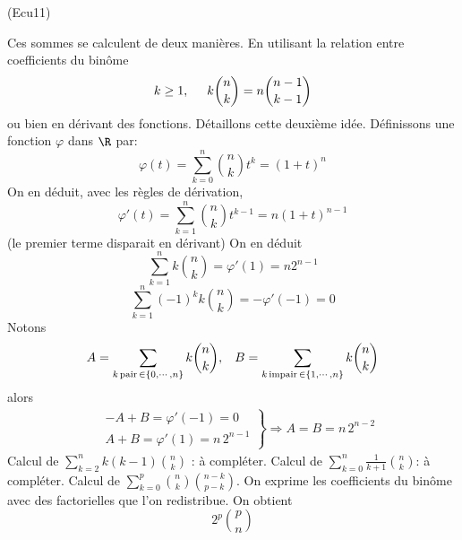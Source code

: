 \begin{tiny}(Ecu11)\end{tiny} Ces sommes se calculent de deux manières. En utilisant la relation entre coefficients du binôme
\begin{displaymath}
  k\geq1,\hspace{0.5cm} k\binom{n}{k} = n\binom{n-1}{k-1} 
\end{displaymath}
ou bien en dérivant des fonctions. Détaillons cette deuxième idée.\newline
Définissons une fonction $\varphi$ dans $\R$ par:
\begin{displaymath}
  \varphi(t) = \sum_{k=0}^n\binom{n}{k}t^k = (1+t)^n
\end{displaymath}
On en déduit, avec les règles de dérivation,
\begin{displaymath}
  \varphi'(t)= \sum_{k=1}^n\binom{n}{k}t^{k-1} = n(1+t)^{n-1}
\end{displaymath}
(le premier terme disparait en dérivant) On en déduit
\begin{displaymath}
  \sum_{k=1}^n k\binom{n}{k} = \varphi'(1)= n2^{n-1}
\end{displaymath}
\begin{displaymath}
  \sum_{k=1}^n (-1)^kk\binom{n}{k} = -\varphi'(-1)= 0
\end{displaymath}
Notons
\begin{displaymath}
A = \sum_{k \,\mathrm{ pair }\,\in \{ 0,\cdots ,n \}} k\binom{n}{k} ,\hspace{0.3cm}
B = \sum _{k \,\mathrm{ impair }\,\in \{ 1,\cdots,n \}}k\binom{n}{k}  
\end{displaymath}
alors
\begin{multline*}
\left. 
\begin{aligned}
  &-A + B = \varphi'(-1)=0 \\ &A+B = \varphi'(1) = n\,2^{n-1}
\end{aligned}
\right\rbrace  \Rightarrow A = B = n\,2^{n-2}
\end{multline*}
Calcul de $\sum_{k=2}^{n}k(k-1) \binom{n}{k}$ : à compléter.\newline
Calcul de $\sum_{k=0}^{n}\frac{1}{k+1} \binom{n}{k}$: à compléter. \newline
Calcul de $\sum_{k=0}^{p} \binom{n}{k} \binom{n-k}{p-k}$. On exprime les coefficients du binôme avec des factorielles que l'on redistribue. On obtient
\begin{displaymath}
 2^p\binom{p}{n}
\end{displaymath}

